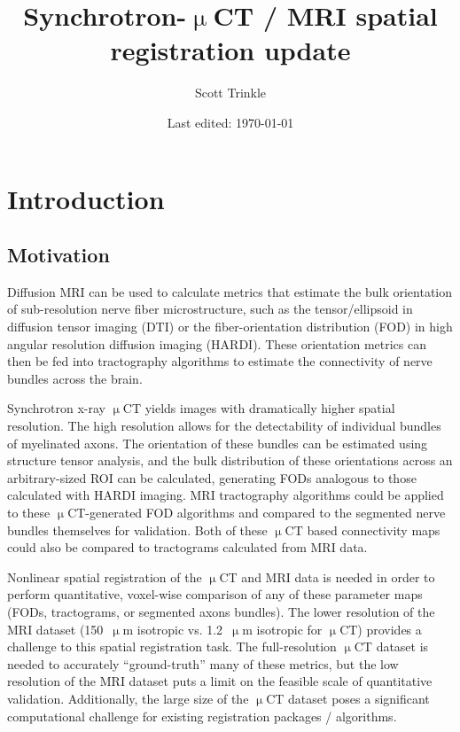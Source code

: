 \documentclass[11pt]{article}
\title{Synchrotron-$\upmu$CT / MRI spatial registration update}
\author{Scott Trinkle}
\date{Last edited: \today}
\begin{document}
\maketitle

\section{Introduction}

\subsection{Motivation}

Diffusion MRI can be used to calculate metrics that estimate the bulk
orientation of sub-resolution nerve fiber microstructure, such as the
tensor/ellipsoid in diffusion tensor imaging (DTI) or the fiber-orientation
distribution (FOD) in high angular resolution diffusion imaging (HARDI). These
orientation metrics can then be fed into tractography algorithms to estimate the
connectivity of nerve bundles across the brain.

Synchrotron x-ray $\upmu$CT yields images with dramatically higher spatial
resolution. The high resolution allows for the detectability of individual bundles
of myelinated axons. The orientation of these bundles can be estimated using
structure tensor analysis, and the bulk distribution of these orientations
across an arbitrary-sized ROI can be calculated, generating FODs analogous to
those calculated with HARDI imaging. MRI tractography algorithms could be
applied to these $\upmu$CT-generated FOD algorithms and compared to the
segmented nerve bundles themselves for validation. Both of these $\upmu$CT based
connectivity maps could also be compared to tractograms calculated from MRI
data.

Nonlinear spatial registration of the $\upmu$CT and MRI data is needed in order
to perform quantitative, voxel-wise comparison of any of these parameter maps
(FODs, tractograms, or segmented axons bundles). The lower resolution of the MRI
dataset (150~$\upmu$m isotropic vs. 1.2~$\upmu$m isotropic for $\upmu$CT)
provides a challenge to this spatial registration task. The full-resolution
$\upmu$CT dataset is needed to accurately ``ground-truth'' many of these
metrics, but the low resolution of the MRI dataset puts a limit on the feasible
scale of quantitative validation. Additionally, the large size of the $\upmu$CT
dataset poses a significant computational challenge for existing registration
packages / algorithms.
\end{document}

